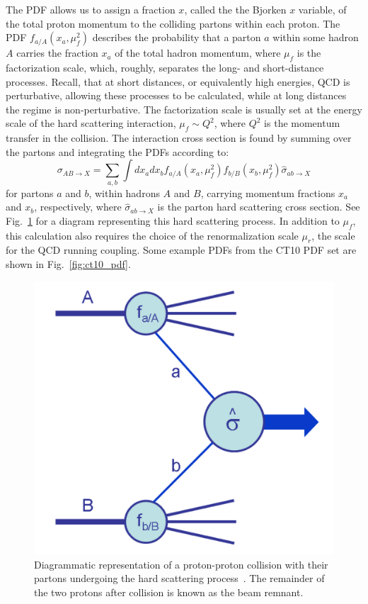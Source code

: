 The PDF allows us to assign a fraction $x$, called the the Bjorken $x$ variable, of the total proton momentum to the colliding partons within each proton. The PDF $f_{a/A}(x_a,\mu_f^2)$ describes the probability that a parton $a$ within some hadron $A$ carries the fraction $x_a$ of the total hadron momentum, where $\mu_f$ is the factorization scale, which, roughly, separates the long- and short-distance processes. Recall, that at short distances, or equivalently high energies, QCD is perturbative, allowing these processes to be calculated, while at long distances the regime is non-perturbative. The factorization scale is usually set at the energy scale of the hard scattering interaction, $\mu_f \sim Q^2$, where $Q^2$ is the momentum transfer in the collision. The interaction cross section is found by summing over the partons and integrating the PDFs according to:
\begin{equation}
  \sigma_{AB\to X} = \sum_{a,b} \int{dx_a dx_b f_{a/A}(x_a,\mu_f^2) f_{b/B}(x_b,\mu_f^2) } \hat{\sigma}_{ab\to X}
\end{equation}
\noindent for partons $a$ and $b$, within hadrons $A$ and $B$, carrying momentum fractions $x_a$ and $x_b$, respectively, where $\hat{\sigma}_{ab\to X}$ is the parton hard scattering cross section. See Fig.~\ref{fig:pp_collision} for a diagram representing this hard scattering process. In addition to $\mu_f$, this calculation also requires the choice of the renormalization scale $\mu_r$, the scale for the QCD running coupling. Some example PDFs from the CT10 PDF set are shown in Fig.~\ref{fig:ct10_pdf}.

\begin{figure}[!htbp]
  \centering
  \includegraphics[scale=0.35]{figures/pp_collision}
  \caption{Diagrammatic representation of a proton-proton collision with their partons undergoing the hard scattering process~\cite{Campbell:2006wx}. The remainder of the two protons after collision is known as the beam remnant.}
  \label{fig:pp_collision}
\end{figure}

